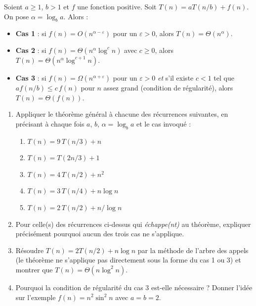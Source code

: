 \documentclass[11pt,a4paper]{article}
\begin{document}
\begin{rappel}
Soient $a\ge1$, $b>1$ et $f$ une fonction positive. Soit $T(n)=aT(n/b)+f(n)$.
On pose $\alpha = \log_b a$. Alors :
\begin{itemize}[leftmargin=*,itemsep=1pt]
  \item \textbf{Cas 1} : si $f(n)=O\!\left(n^{\alpha-\varepsilon}\right)$ pour un
        $\varepsilon>0$, alors $T(n)=\Theta\!\left(n^{\alpha}\right)$.
  \item \textbf{Cas 2} : si $f(n)=\Theta\!\left(n^{\alpha}\log^{c} n\right)$ avec $c\ge0$,
        alors $T(n)=\Theta\!\left(n^{\alpha}\log^{c+1} n\right)$.
  \item \textbf{Cas 3} : si $f(n)=\Omega\!\left(n^{\alpha+\varepsilon}\right)$ pour un
        $\varepsilon>0$ \emph{et} s'il existe $c<1$ tel que $a f(n/b)\le c\,f(n)$ pour
        $n$ assez grand (condition de régularité), alors $T(n)=\Theta\!\left(f(n)\right)$.
\end{itemize}
\end{rappel}

\begin{enumerate}[label=\arabic*.,leftmargin=*]
  \item Appliquer le théorème général à chacune des récurrences suivantes, en
        précisant à chaque fois $a$, $b$, $\alpha=\log_b a$ et le cas invoqué :
        \begin{enumerate}[label=(\alph*),itemsep=1pt]
          \item $T(n) = 9\,T(n/3) + n$
          \item $T(n) = T(2n/3) + 1$
          \item $T(n) = 4\,T(n/2) + n^2$
          \item $T(n) = 3\,T(n/4) + n\log n$
          \item $T(n) = 2\,T(n/2) + n/\log n$
        \end{enumerate}
  \item Pour celle(s) des récurrences ci-dessus qui \emph{échappe(nt)} au théorème,
        expliquer précisément pourquoi aucun des trois cas ne s'applique.
  \item Résoudre $T(n) = 2T(n/2) + n\log n$ par la méthode de l'arbre des appels
        (le théorème ne s'applique pas directement sous la forme du cas 1 ou 3) et
        montrer que $T(n) = \Theta(n\log^2 n)$.
  \item Pourquoi la condition de régularité du cas 3 est-elle nécessaire ?
        Donner l'idée sur l'exemple $f(n)=n^{2}\sin^{2} n$ avec $a=b=2$.
\end{enumerate}
\end{document}
